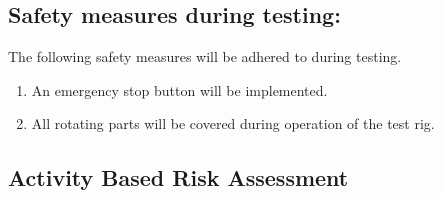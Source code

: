 \subsection*{Safety measures during testing:}
The following safety measures will be adhered to during testing.
\begin{enumerate}
	\item An emergency stop button will be implemented.
	\item All rotating parts will be covered during operation of the test rig.
\end{enumerate}

\newpage

\subsection*{Activity Based Risk Assessment}

